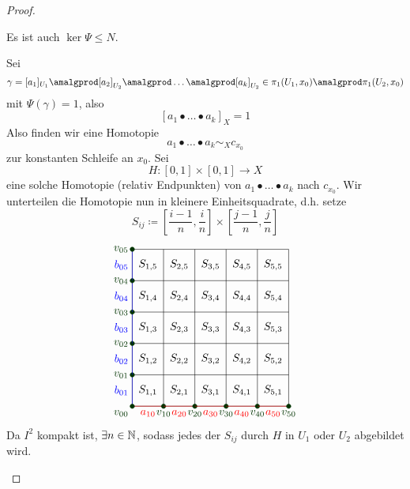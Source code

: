 \begin{proof}
    \begin{claim}
        Es ist auch $\ker \Psi \leq  N$.
    \end{claim}
    \begin{subproof}
        Sei
        \[
            \gamma = [a_1]_{U_1} \amalgprod [a_2]_{U_2}\amalgprod \ldots \amalgprod [a_k]_{U_2} \in  \pi_1(U_1,x_0) \amalgprod  \pi_1(U_2,x_0)
        \] 
        mit $\Psi(γ) = 1$, also
        \[
            [a_1 \bullet  \ldots \bullet  a_k]_X = 1
        \] 
        Also finden wir eine Homotopie
        \[
        a_1 \bullet \ldots \bullet  a_k \sim _X c_{x_0}
        \] 
        zur konstanten Schleife an $x_0$. Sei 
        \[
            H\colon  [0,1] \times  [0,1] \to X
        \] 
        eine solche Homotopie (relativ Endpunkten) von $a_1\bullet \ldots\bullet a_k$ nach $c_{x_0}$. Wir unterteilen die Homotopie nun in kleinere Einheitsquadrate, d.h. setze
        \[
        S_{ij} \coloneqq  \left[ \frac{i-1}{n}, \frac{i}{n} \right] \times \left[ \frac{j-1}{n}, \frac{j}{n} \right] 
        \] 
        \[
    \begin{tikzpicture}
        \draw (0,0) grid (5,5);
        \foreach \x in {1,2,3,4,5} {
            \foreach \y in {1,2,3,4,5} {
                \node at (\x-0.5, \y-0.5) {$S_{\x, \y}$};
            }
        }
        \foreach \x in {1,2,3,4,5} {
            \draw[red] (\x-1,0) -- (\x,0) node[midway, anchor=north] {$a_{\x 0}$};
            \draw[green!20!black, fill] (\x,0) circle (2pt) node[anchor=north] {$v_{\x 0}$};
        }
        \foreach \y in {1,2,3,4,5} {
            \draw[blue] (0,\y-1) -- (0,\y) node[midway, anchor=east] {$b_{0\y}$};
            \draw[green!20!black, fill] (0,\y) circle (2pt) node[anchor=east] {$v_{0\y}$};
        }
        \draw[green!20!black, fill] (0,0) circle (2pt) node[anchor= north east] {$v_{00}$};
    \end{tikzpicture}
\]
Da $I^2$ kompakt ist, $\exists n\in \mathbb{N}$, sodass jedes der $S_{ij}$ durch $H$ in  $U_1$ oder $U_2$ abgebildet wird.


\end{subproof}
\end{proof}
